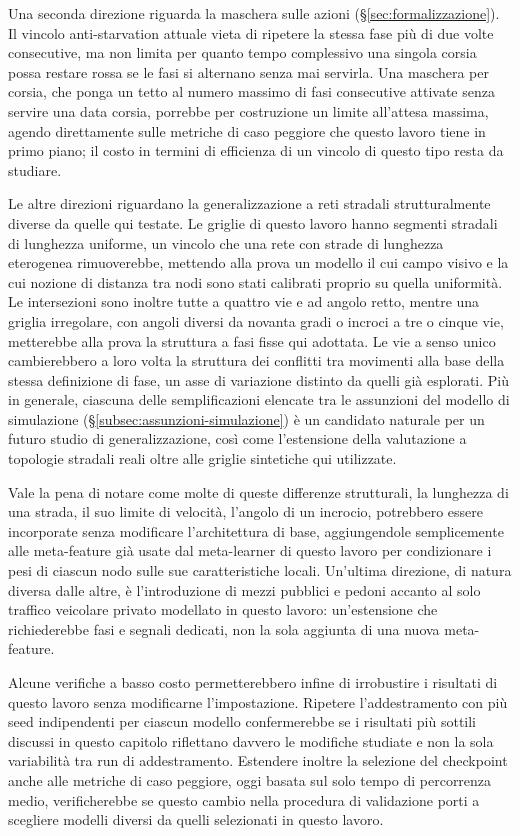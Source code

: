 Una seconda direzione riguarda la maschera sulle azioni
(§\ref{sec:formalizzazione}). Il vincolo anti-starvation attuale vieta di
ripetere la stessa fase più di due volte consecutive, ma non limita per
quanto tempo complessivo una singola corsia possa restare rossa se le
fasi si alternano senza mai servirla. Una maschera per corsia, che ponga
un tetto al numero massimo di fasi consecutive attivate senza servire una
data corsia, porrebbe per costruzione un limite all'attesa massima,
agendo direttamente sulle metriche di caso peggiore che questo lavoro
tiene in primo piano; il costo in termini di efficienza di un vincolo di
questo tipo resta da studiare.

Le altre direzioni riguardano la generalizzazione a reti stradali
strutturalmente diverse da quelle qui testate. Le griglie di questo
lavoro hanno segmenti stradali di lunghezza uniforme, un vincolo che una
rete con strade di lunghezza eterogenea rimuoverebbe, mettendo alla prova
un modello il cui campo visivo e la cui nozione di distanza tra nodi sono
stati calibrati proprio su quella uniformità. Le intersezioni sono
inoltre tutte a quattro vie e ad angolo retto, mentre una griglia
irregolare, con angoli diversi da novanta gradi o incroci a tre o cinque
vie, metterebbe alla prova la struttura a fasi fisse qui adottata. Le vie
a senso unico cambierebbero a loro volta la struttura dei conflitti tra
movimenti alla base della stessa definizione di fase, un asse di
variazione distinto da quelli già esplorati. Più in generale, ciascuna
delle semplificazioni elencate tra le assunzioni del modello di
simulazione (§\ref{subsec:assunzioni-simulazione}) è un candidato
naturale per un futuro studio di generalizzazione, così come l'estensione
della valutazione a topologie stradali reali oltre alle griglie
sintetiche qui utilizzate.

Vale la pena di notare come molte di queste differenze strutturali, la
lunghezza di una strada, il suo limite di velocità, l'angolo di un
incrocio, potrebbero essere incorporate senza modificare l'architettura
di base, aggiungendole semplicemente alle meta-feature già usate dal
meta-learner di questo lavoro per condizionare i pesi di ciascun nodo
sulle sue caratteristiche locali. Un'ultima direzione, di natura diversa
dalle altre, è l'introduzione di mezzi pubblici e pedoni accanto al solo
traffico veicolare privato modellato in questo lavoro: un'estensione che
richiederebbe fasi e segnali dedicati, non la sola aggiunta di una nuova
meta-feature.

Alcune verifiche a basso costo permetterebbero infine di irrobustire i
risultati di questo lavoro senza modificarne l'impostazione. Ripetere
l'addestramento con più seed indipendenti per ciascun modello
confermerebbe se i risultati più sottili discussi in questo capitolo
riflettano davvero le modifiche studiate e non la sola variabilità tra
run di addestramento. Estendere inoltre la selezione del checkpoint
anche alle metriche di caso
peggiore, oggi basata sul solo tempo di percorrenza medio, verificherebbe
se questo cambio nella procedura di validazione porti a scegliere modelli
diversi da quelli selezionati in questo lavoro.
